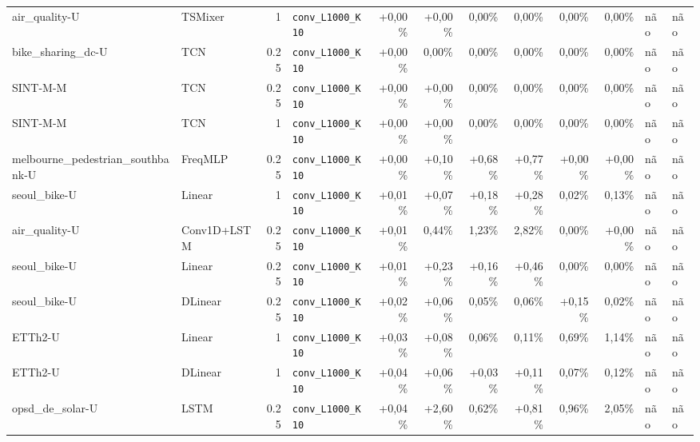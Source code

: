 \begin{longtable}{llrlrrrrrrll}
air\_quality-U & TSMixer & 1 & \texttt{conv\_\allowbreak{}L1000\_\allowbreak{}K10} & +0,00\% & +0,00\% & \textminus{}0,00\% & \textminus{}0,00\% & \textminus{}0,00\% & \textminus{}0,00\% & n\~ao & n\~ao \\
bike\_sharing\_dc-U & TCN & 0.25 & \texttt{conv\_\allowbreak{}L1000\_\allowbreak{}K10} & +0,00\% & \textminus{}0,00\% & \textminus{}0,00\% & \textminus{}0,00\% & \textminus{}0,00\% & \textminus{}0,00\% & n\~ao & n\~ao \\
SINT-M-M & TCN & 0.25 & \texttt{conv\_\allowbreak{}L1000\_\allowbreak{}K10} & +0,00\% & +0,00\% & \textminus{}0,00\% & \textminus{}0,00\% & \textminus{}0,00\% & \textminus{}0,00\% & n\~ao & n\~ao \\
SINT-M-M & TCN & 1 & \texttt{conv\_\allowbreak{}L1000\_\allowbreak{}K10} & +0,00\% & +0,00\% & \textminus{}0,00\% & \textminus{}0,00\% & \textminus{}0,00\% & \textminus{}0,00\% & n\~ao & n\~ao \\
melbourne\_pedestrian\_southbank-U & FreqMLP & 0.25 & \texttt{conv\_\allowbreak{}L1000\_\allowbreak{}K10} & +0,00\% & +0,10\% & +0,68\% & +0,77\% & +0,00\% & +0,00\% & n\~ao & n\~ao \\
seoul\_bike-U & Linear & 1 & \texttt{conv\_\allowbreak{}L1000\_\allowbreak{}K10} & +0,01\% & +0,07\% & +0,18\% & +0,28\% & \textminus{}0,02\% & \textminus{}0,13\% & n\~ao & n\~ao \\
air\_quality-U & Conv1D+LSTM & 0.25 & \texttt{conv\_\allowbreak{}L1000\_\allowbreak{}K10} & +0,01\% & \textminus{}0,44\% & \textminus{}1,23\% & \textminus{}2,82\% & \textminus{}0,00\% & +0,00\% & n\~ao & n\~ao \\
seoul\_bike-U & Linear & 0.25 & \texttt{conv\_\allowbreak{}L1000\_\allowbreak{}K10} & +0,01\% & +0,23\% & +0,16\% & +0,46\% & \textminus{}0,00\% & \textminus{}0,00\% & n\~ao & n\~ao \\
seoul\_bike-U & DLinear & 0.25 & \texttt{conv\_\allowbreak{}L1000\_\allowbreak{}K10} & +0,02\% & +0,06\% & \textminus{}0,05\% & \textminus{}0,06\% & +0,15\% & \textminus{}0,02\% & n\~ao & n\~ao \\
ETTh2-U & Linear & 1 & \texttt{conv\_\allowbreak{}L1000\_\allowbreak{}K10} & +0,03\% & +0,08\% & \textminus{}0,06\% & \textminus{}0,11\% & \textminus{}0,69\% & \textminus{}1,14\% & n\~ao & n\~ao \\
ETTh2-U & DLinear & 1 & \texttt{conv\_\allowbreak{}L1000\_\allowbreak{}K10} & +0,04\% & +0,06\% & +0,03\% & +0,11\% & \textminus{}0,07\% & \textminus{}0,12\% & n\~ao & n\~ao \\
opsd\_de\_solar-U & LSTM & 0.25 & \texttt{conv\_\allowbreak{}L1000\_\allowbreak{}K10} & +0,04\% & +2,60\% & \textminus{}0,62\% & +0,81\% & \textminus{}0,96\% & \textminus{}2,05\% & n\~ao & n\~ao \\

\end{longtable}
